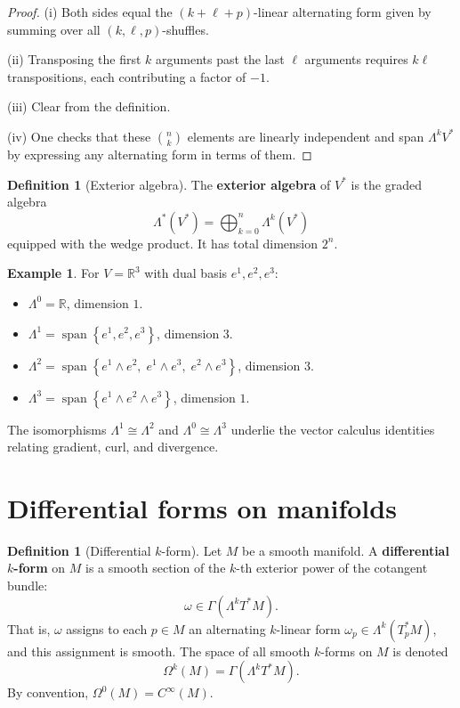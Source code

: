 \documentclass[12pt,a4paper,openany]{book}
\theoremstyle{definition}
\newtheorem{definition}[theorem]{Definition}
\newtheorem{example}[theorem]{Example}
\theoremstyle{remark}
\newcommand{\R}{\mathbb{R}}
\newcommand{\set}[1]{\left\{ #1 \right\}}
\begin{document}
\begin{proof}
(i) Both sides equal the $(k+\ell+p)$-linear alternating form given by
summing over all $(k,\ell,p)$-shuffles.

(ii) Transposing the first $k$ arguments past the last $\ell$ arguments
requires $k\ell$ transpositions, each contributing a factor of $-1$.

(iii) Clear from the definition.

(iv) One checks that these $\binom{n}{k}$ elements are linearly independent
and span $\Lambda^k V^*$ by expressing any alternating form in terms of them.
\end{proof}

\begin{definition}[Exterior algebra]\label{def:exterior-algebra}
The \textbf{exterior algebra} of $V^*$ is the graded algebra
\[
  \Lambda^*(V^*) = \bigoplus_{k=0}^{n} \Lambda^k(V^*)
\]
equipped with the wedge product. It has total dimension $2^n$.
\end{definition}

\begin{example}\label{ex:exterior-R3}
For $V = \R^3$ with dual basis $e^1, e^2, e^3$:
\begin{itemize}
  \item $\Lambda^0 = \R$, dimension $1$.
  \item $\Lambda^1 = \operatorname{span}\set{e^1, e^2, e^3}$, dimension $3$.
  \item $\Lambda^2 = \operatorname{span}\set{e^1 \wedge e^2,\;
    e^1 \wedge e^3,\; e^2 \wedge e^3}$, dimension $3$.
  \item $\Lambda^3 = \operatorname{span}\set{e^1 \wedge e^2 \wedge e^3}$,
    dimension $1$.
\end{itemize}
The isomorphisms $\Lambda^1 \cong \Lambda^2$ and $\Lambda^0 \cong \Lambda^3$
underlie the vector calculus identities relating gradient, curl, and divergence.
\end{example}

\section{Differential forms on manifolds}\label{sec:differential-forms}

\begin{definition}[Differential $k$-form]\label{def:differential-form}
Let $M$ be a smooth manifold. A \textbf{differential $k$-form}
on $M$ is a smooth section of the $k$-th exterior power of the cotangent
bundle:
\[
  \omega \in \Gamma(\Lambda^k T^*M).
\]
That is, $\omega$ assigns to each $p \in M$ an alternating $k$-linear form
$\omega_p \in \Lambda^k(T_p^*M)$, and this assignment is smooth. The space
of all smooth $k$-forms on $M$ is denoted
\[
  \Omega^k(M) = \Gamma(\Lambda^k T^*M).
\]
By convention, $\Omega^0(M) = C^\infty(M)$.
\end{definition}
\end{document}

